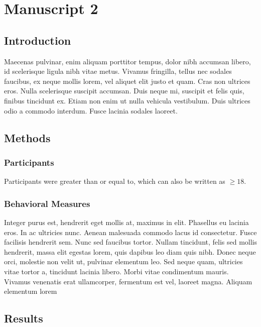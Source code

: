 \chapter{Manuscript 2}\label{chap:manuscript_2}


\section{Introduction}

Maecenas pulvinar, enim aliquam porttitor tempus, dolor nibh accumsan libero, id scelerisque ligula nibh vitae metus. Vivamus fringilla, tellus nec sodales faucibus, ex neque mollis lorem, vel aliquet elit justo et quam. Cras non ultrices eros. Nulla scelerisque suscipit accumsan. Duis neque mi, suscipit et felis quis, finibus tincidunt ex. Etiam non enim ut nulla vehicula vestibulum. Duis ultrices odio a commodo interdum. Fusce lacinia sodales laoreet.

\section{Methods}

\subsection*{Participants}

Participants were greater than or equal to, which can also be written as $\geq 18$.

\subsection*{Behavioral Measures}

Integer purus est, hendrerit eget mollis at, maximus in elit. Phasellus eu lacinia eros. In ac ultricies nunc. Aenean malesuada commodo lacus id consectetur. Fusce facilisis hendrerit sem. Nunc sed faucibus tortor. Nullam tincidunt, felis sed mollis hendrerit, massa elit egestas lorem, quis dapibus leo diam quis nibh. Donec neque orci, molestie non velit ut, pulvinar elementum leo. Sed neque quam, ultricies vitae tortor a, tincidunt lacinia libero. Morbi vitae condimentum mauris. Vivamus venenatis erat ullamcorper, fermentum est vel, laoreet magna. Aliquam elementum lorem

\section{Results}

